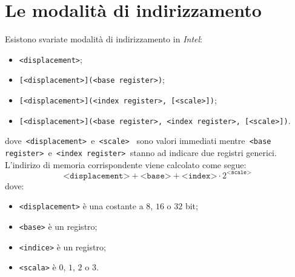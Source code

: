 \documentclass[class=book, crop=false, oneside]{standalone}
\begin{document}
\section{Le modalità di indirizzamento}
Esistono svariate modalità di indirizzamento in \emph{Intel}:
\begin{itemize}
	\item \texttt{<displacement>};
	\item \texttt{[<displacement>](<base register>)};
	\item \texttt{[<displacement>](<index register>, [<scale>])};
	\item \texttt{[<displacement>](<base register>, <index register>, [<scale>])}.
\end{itemize}
dove\texttt{ <displacement> }e\texttt{ <scale> } sono valori immediati mentre\texttt{ <base register> }e\texttt{ <index register> }stanno ad indicare due registri generici. L'indirizo di memoria corrispondente viene calcolato come segue:
\begin{equation*}
	\texttt{<displacement>} + \texttt{<base>} + \texttt{<index>} \cdot 2^\texttt{<scale>}
\end{equation*}
dove:
\begin{itemize}
	\item \texttt{<displacement>} è una costante a \(8\), \(16\) o \(32\) bit;
	\item \texttt{<base>} è un registro;
	\item \texttt{<indice>} è un registro;
	\item \texttt{<scala>} è \(0\), \(1\), \(2\) o \(3\).
\end{itemize}
\end{document}
